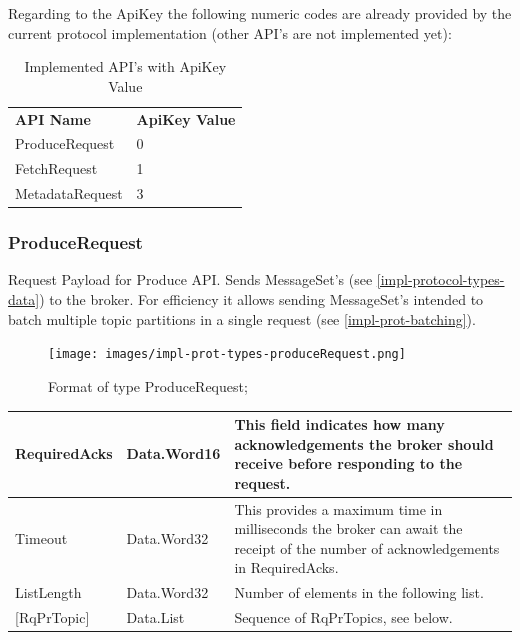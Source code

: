 Regarding to the ApiKey the following numeric codes are already provided by the
current protocol implementation (other API's are not implemented yet):

\begin{table}[H]
    \centering
    \begin{tabular}{ll}
        {\bf API Name}  & {\bf ApiKey Value} \\
        ProduceRequest  & 0                  \\
        FetchRequest    & 1                  \\
        MetadataRequest & 3                 
    \end{tabular}
    \caption{Implemented API's with ApiKey Value}
\end{table}


\subsubsection{ProduceRequest}
\label{subsec:protocol-types-producerequest}

Request Payload for Produce API. Sends MessageSet's (see
\ref{impl-protocol-types-data}) to the broker. For efficiency it allows sending
MessageSet's intended to batch multiple topic partitions in a single request
(see \ref{impl-prot-batching}).

\begin{figure}[H]
    \centering
    \texttt{[image: images/impl-prot-types-produceRequest.png]}
    \caption{Format of type ProduceRequest;}
    \label{fig:impl-prot-types-produceRequest}
\end{figure}

\begin{table}[H]
\centering
\begin{tabular}{ l  l  p{8.5cm} }
\hline
RequiredAcks  & Data.Word16 & This field indicates how many acknowledgements the broker should receive before responding to the request.                       \\ \hline
Timeout       & Data.Word32 & This provides a maximum time in milliseconds the broker can await the receipt of the number of acknowledgements in RequiredAcks. \\ \hline
ListLength    & Data.Word32 & Number of elements in the following list.                                                                                             \\ \hline
{[}RqPrTopic{]} & Data.List   & Sequence of RqPrTopics, see below.                                                                                                  \\ \hline
\end{tabular}
\end{table}

